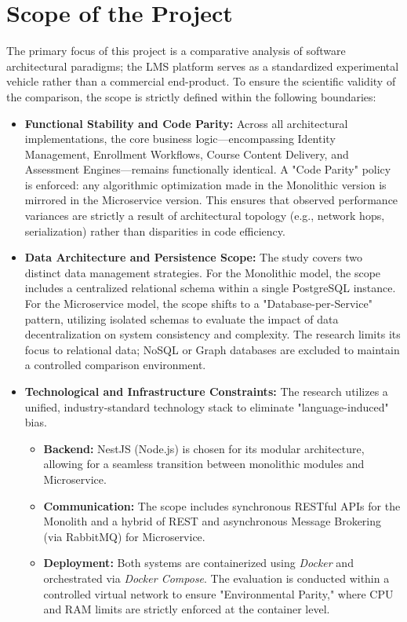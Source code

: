 \section{Scope of the Project}

The primary focus of this project is a comparative analysis of software architectural paradigms; the LMS platform serves as a standardized experimental vehicle rather than a commercial end-product. To ensure the scientific validity of the comparison, the scope is strictly defined within the following boundaries:

\begin{itemize}
\item \textbf{Functional Stability and Code Parity:}
Across all architectural implementations, the core business logic—encompassing Identity Management, Enrollment Workflows, Course Content Delivery, and Assessment Engines—remains functionally identical. A "Code Parity" policy is enforced: any algorithmic optimization made in the Monolithic version is mirrored in the Microservice version. This ensures that observed performance variances are strictly a result of architectural topology (e.g., network hops, serialization) rather than disparities in code efficiency.

\item \textbf{Data Architecture and Persistence Scope:} 
The study covers two distinct data management strategies. For the Monolithic model, the scope includes a centralized relational schema within a single PostgreSQL instance. For the Microservice model, the scope shifts to a "Database-per-Service" pattern, utilizing isolated schemas to evaluate the impact of data decentralization on system consistency and complexity. The research limits its focus to relational data; NoSQL or Graph databases are excluded to maintain a controlled comparison environment.

\item \textbf{Technological and Infrastructure Constraints:} 
The research utilizes a unified, industry-standard technology stack to eliminate "language-induced" bias.
\begin{itemize}
    \item \textbf{Backend:} NestJS (Node.js) is chosen for its modular architecture, allowing for a seamless transition between monolithic modules and Microservice.
    \item \textbf{Communication:} The scope includes synchronous RESTful APIs for the Monolith and a hybrid of REST and asynchronous Message Brokering (via RabbitMQ) for Microservice.
    \item \textbf{Deployment:} Both systems are containerized using \textit{Docker} and orchestrated via \textit{Docker Compose}. The evaluation is conducted within a controlled virtual network to ensure "Environmental Parity," where CPU and RAM limits are strictly enforced at the container level.
\end{itemize}


\end{itemize}
